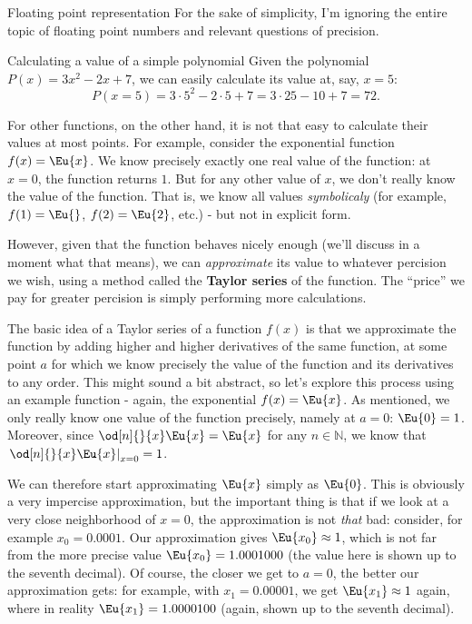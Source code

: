 \begin{note}{Floating point representation}{}
  For the sake of simplicity, I'm ignoring the entire topic of floating point numbers and relevant questions of precision.
\end{note}

\begin{example}{Calculating a value of a simple polynomial}{}
  Given the polynomial $P(x)=3x^{2}-2x+7$, we can easily calculate its value at, say, $x=5$:
  \[
    P(x=5) = 3\cdot5^{2}-2\cdot5+7 = 3\cdot25-10+7 = 72.
  \]
\end{example}

For other functions, on the other hand, it is not that easy to calculate their values at most points. For example, consider the exponential function $f(x)=\Eu{x}$. We know precisely exactly one real value of the function: at $x=0$, the function returns $1$. But for any other value of $x$, we don't really know the value of the function. That is, we know all values \textit{symbolicaly} (for example, $f(1)=\Eu{}$, $f(2)=\Eu{2}$, etc.) - but not in explicit form.

However, given that the function behaves nicely enough (we'll discuss in a moment what that means), we can \textit{approximate} its value to whatever percision we wish, using a method called the \textbf{Taylor series} of the function. The \enquote{price} we pay for greater percision is simply performing more calculations.

The basic idea of a Taylor series of a function $f(x)$ is that we approximate the function by adding higher and higher derivatives of the same function, at some point $a$ for which we know precisely the value of the function and its derivatives to any order. This might sound a bit abstract, so let's explore this process using an example function - again, the exponential $f(x)=\Eu{x}$. As mentioned, we only really know one value of the function precisely, namely at $a=0$: $\Eu{0}=1$. Moreover, since $\od[n]{}{x}\Eu{x}=\Eu{x}$ for any $n\in\mathbb{N}$, we know that $\left.\od[n]{}{x}\Eu{x}\right|_{x=0}=1$.

  We can therefore start approximating $\Eu{x}$ simply as $\Eu{0}$. This is obviously a very impercise approximation, but the important thing is that if we look at a very close neighborhood of $x=0$, the approximation is not \textit{that} bad: consider, for example $x_{0}=0.0001$. Our approximation gives $\Eu{x_{0}}\approx1$, which is not far from the more precise value $\Eu{x_{0}}=1.0001000$ (the value here is shown up to the seventh decimal). Of course, the closer we get to $a=0$, the better our approximation gets: for example, with $x_{1}=0.00001$, we get $\Eu{x_{1}}\approx1$ again, where in reality $\Eu{x_{1}}=1.0000100$ (again, shown up to the seventh decimal). 

